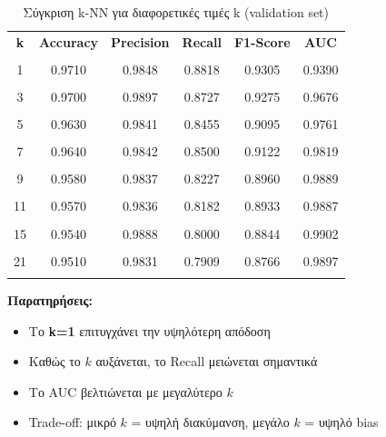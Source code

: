 \documentclass[12pt,a4paper,twoside]{book}
\begin{document}
\begin{table}[H]
    \centering
    \small
    \begin{tabular}{cccccc}
        \hline
        \textbf{k} & \textbf{Accuracy} & \textbf{Precision} & \textbf{Recall} & \textbf{F1-Score} & \textbf{AUC} \\\\
        \hline
        1          & 0.9710            & 0.9848             & 0.8818          & 0.9305            & 0.9390       \\\\
        3          & 0.9700            & 0.9897             & 0.8727          & 0.9275            & 0.9676       \\\\
        5          & 0.9630            & 0.9841             & 0.8455          & 0.9095            & 0.9761       \\\\
        7          & 0.9640            & 0.9842             & 0.8500          & 0.9122            & 0.9819       \\\\
        9          & 0.9580            & 0.9837             & 0.8227          & 0.8960            & 0.9889       \\\\
        11         & 0.9570            & 0.9836             & 0.8182          & 0.8933            & 0.9887       \\\\
        15         & 0.9540            & 0.9888             & 0.8000          & 0.8844            & 0.9902       \\\\
        21         & 0.9510            & 0.9831             & 0.7909          & 0.8766            & 0.9897       \\\\
        \hline
    \end{tabular}
    \caption{Σύγκριση k-NN για διαφορετικές τιμές k (validation set)}
    \label{tab:knn-comparison}
\end{table}

\textbf{Παρατηρήσεις:}
\begin{itemize}
    \item Το \textbf{k=1} επιτυγχάνει την υψηλότερη απόδοση
    \item Καθώς το \(k\) αυξάνεται, το Recall μειώνεται σημαντικά
    \item Το AUC βελτιώνεται με μεγαλύτερο \(k\)
    \item Trade-off: μικρό \(k\) = υψηλή διακύμανση, μεγάλο \(k\) = υψηλό bias
\end{itemize}
\end{document}
